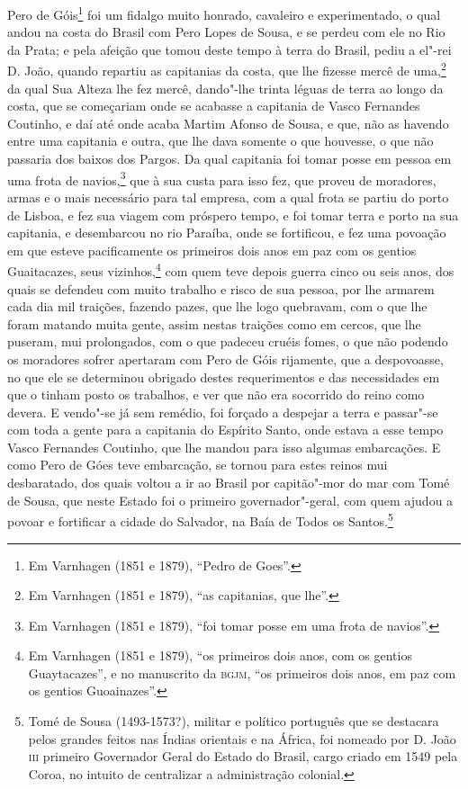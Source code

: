 Pero de Góis\footnote{ Em Varnhagen (1851 e 1879), ``Pedro de Goes''.} foi um fidalgo
muito honrado, cavaleiro e experimentado, o qual andou na costa do Brasil com Pero Lopes
de Sousa, e se perdeu com ele no Rio da Prata; e pela afeição que tomou deste tempo à
terra do Brasil, pediu a el"-rei D. João, quando repartiu as capitanias da costa, que lhe
fizesse mercê de uma,\footnote{ Em Varnhagen (1851 e 1879), ``as capitanias, que lhe''.}
da qual Sua Alteza lhe fez mercê, dando"-lhe trinta léguas de terra ao longo da costa, que
se começariam onde se acabasse a capitania de Vasco Fernandes Coutinho, e daí até onde
acaba Martim Afonso de Sousa, e que, não as havendo entre uma capitania e outra, que lhe
dava somente o que houvesse, o que não passaria dos baixos dos Pargos. Da qual capitania
foi tomar posse em pessoa em uma frota de navios,\footnote{ Em Varnhagen (1851 e 1879),
``foi tomar posse em uma frota de navios''.} que à sua custa para isso fez, que proveu de
moradores, armas e o mais necessário para tal empresa, com a qual frota se partiu do porto
de Lisboa, e fez sua viagem com próspero tempo, e foi tomar terra e porto na sua
capitania, e desembarcou no rio Paraíba, onde se fortificou, e fez uma povoação em que
esteve pacificamente os primeiros dois anos em paz com os gentios Guaitacazes, seus
vizinhos,\footnote{ Em Varnhagen (1851 e 1879), ``os primeiros dois anos, com os gentios
Guaytacazes'', e no manuscrito da \textsc{bgjm}, ``os primeiros dois anos, em paz com os
gentios Guoainazes''.} com quem teve depois guerra cinco ou seis anos, dos quais se
defendeu com muito trabalho e risco de sua pessoa, por lhe armarem cada dia mil traições,
fazendo pazes, que lhe logo quebravam, com o que lhe foram matando muita gente, assim
nestas traições como em cercos, que lhe puseram, mui prolongados, com o que padeceu cruéis
fomes, o que não podendo os moradores sofrer apertaram com Pero de Góis rijamente, que a
despovoasse, no que ele se determinou obrigado destes requerimentos e das necessidades em
que o tinham posto os trabalhos, e ver que não era socorrido do reino como devera. E
vendo"-se já sem remédio, foi forçado a despejar a terra e passar"-se com toda a gente para
a capitania do Espírito Santo, onde estava a esse tempo Vasco Fernandes Coutinho, que lhe
mandou para isso algumas embarcações. E como Pero de Góes teve embarcação, se tornou para
estes reinos mui desbaratado, dos quais voltou a ir ao Brasil por capitão"-mor do mar com
Tomé de Sousa, que neste Estado foi o primeiro governador"-geral, com quem ajudou a povoar
e fortificar a cidade do Salvador, na Baía de Todos os Santos.\footnote{ Tomé de Sousa
(1493-1573?), militar e político português que se destacara pelos grandes feitos nas
Índias orientais e na África, foi nomeado por D. João \textsc{iii} primeiro Governador
Geral do Estado do Brasil, cargo criado em 1549 pela Coroa, no intuito de centralizar a
administração colonial.}

